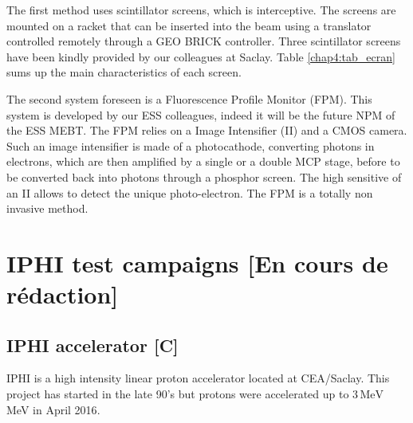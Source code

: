 \begin{refsection}
  The first method uses scintillator screens, which is interceptive. The screens are mounted on a racket that can be inserted into the beam using a translator controlled remotely through a GEO BRICK controller. Three scintillator screens have been kindly provided by our colleagues at Saclay. Table \ref{chap4:tab_ecran} sums up the main characteristics of each screen.
  
  

  The second system foreseen is a Fluorescence Profile Monitor (FPM). This system is developed by our ESS colleagues, indeed it will be the future NPM of the ESS MEBT. The FPM relies on a Image Intensifier (II) and a CMOS camera. 
Such an image intensifier is made of a photocathode, converting photons in electrons, which are then amplified by a single or a double MCP stage, before to be converted back into photons through a phosphor screen. The high sensitive of an II allows to detect the unique photo-electron. The FPM is a totally non invasive method.



  \section{IPHI test campaigns [En cours de rédaction]}
  

  \subsection{IPHI accelerator [C]}
  IPHI is a high intensity linear proton accelerator located at CEA/Saclay.
  This project has started in the late 90's\cite{Beau2000} but protons were accelerated up to $3\,\mathrm{MeV}$ MeV in April 2016\cite{Gobin2016}.


\end{refsection}
